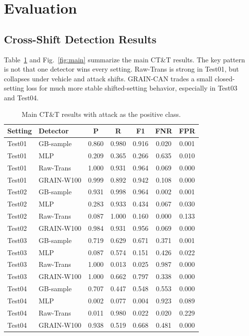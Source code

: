 \documentclass[runningheads]{llncs}
\newcommand{\method}{GRAIN-CAN}
\begin{document}
\section{Evaluation}
\subsection{Cross-Shift Detection Results}
Table~\ref{tab:main} and Fig.~\ref{fig:main} summarize the main CT\&T results. The key pattern is not that one detector wins every setting. Raw-Trans is strong in Test01, but collapses under vehicle and attack shifts. \method{} trades a small closed-setting loss for much more stable shifted-setting behavior, especially in Test03 and Test04.

\begin{table}[t]
\caption{Main CT\&T results with attack as the positive class.}
\label{tab:main}
\centering\small
\begin{tabular}{llccccc}
\toprule
Setting & Detector & P & R & F1 & FNR & FPR \\
\midrule
Test01 & GB-sample & 0.860 & 0.980 & 0.916 & 0.020 & 0.001 \\
Test01 & MLP & 0.209 & 0.365 & 0.266 & 0.635 & 0.010 \\
Test01 & Raw-Trans & 1.000 & 0.931 & 0.964 & 0.069 & 0.000 \\
Test01 & GRAIN-W100 & 0.999 & 0.892 & 0.942 & 0.108 & 0.000 \\
\midrule
Test02 & GB-sample & 0.931 & 0.998 & 0.964 & 0.002 & 0.001 \\
Test02 & MLP & 0.283 & 0.933 & 0.434 & 0.067 & 0.030 \\
Test02 & Raw-Trans & 0.087 & 1.000 & 0.160 & 0.000 & 0.133 \\
Test02 & GRAIN-W100 & 0.984 & 0.931 & 0.956 & 0.069 & 0.000 \\
\midrule
Test03 & GB-sample & 0.719 & 0.629 & 0.671 & 0.371 & 0.001 \\
Test03 & MLP & 0.087 & 0.574 & 0.151 & 0.426 & 0.022 \\
Test03 & Raw-Trans & 1.000 & 0.013 & 0.025 & 0.987 & 0.000 \\
Test03 & GRAIN-W100 & 1.000 & 0.662 & 0.797 & 0.338 & 0.000 \\
\midrule
Test04 & GB-sample & 0.707 & 0.447 & 0.548 & 0.553 & 0.000 \\
Test04 & MLP & 0.002 & 0.077 & 0.004 & 0.923 & 0.089 \\
Test04 & Raw-Trans & 0.011 & 0.980 & 0.022 & 0.020 & 0.229 \\
Test04 & GRAIN-W100 & 0.938 & 0.519 & 0.668 & 0.481 & 0.000 \\
\bottomrule
\end{tabular}
\end{table}
\end{document}
